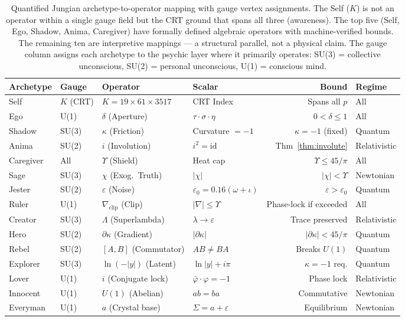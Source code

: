 \begin{table}[H]
\centering
{\small
\begin{tabular}{@{}llllrl@{}}
\toprule
\textbf{Archetype} & \textbf{Gauge} & \textbf{Operator} & \textbf{Scalar} & \textbf{Bound} & \textbf{Regime} \\
\midrule
Self       & $K$ (CRT)  & $K = 19\!\times\!61\!\times\!3517$ & CRT Index & Spans all $p$ & All \\
Ego        & U(1)       & $\delta$ (Aperture)   & $\tau \cdot \sigma \cdot \eta$ & $0 < \delta \leq 1$ & All \\
Shadow     & SU(3)      & $\kappa$ (Friction)   & Curvature $= -1$     & $\kappa = -1$ (fixed) & Quantum \\
Anima      & SU(2)      & $i$ (Involution)      & $i^2 = \mathrm{id}$  & Thm~\ref{thm:involute} & Relativistic \\
Caregiver  & All        & $\Upsilon$ (Shield)   & Heat cap  & $\Upsilon \leq 45/\pi$ & All \\
\midrule
Sage       & SU(3)      & $\chi$ (Exog.~Truth)  & $|\chi|$ & $|\chi| < \Upsilon$ & Newtonian \\
Jester     & SU(2)      & $\varepsilon$ (Noise) & $\varepsilon_0 = 0.16(\omega+\iota)$ & $\varepsilon > \varepsilon_0$ & Quantum \\
Ruler      & U(1)       & $\nabla_{\mathrm{clip}}$ (Clip) & $|\nabla| \leq \Upsilon$ & Phase-lock if exceeded & All \\
Creator    & SU(3)      & $\Lambda$ (Superlambda) & $\lambda \to \varepsilon$ & Trace preserved & Relativistic \\
\midrule
Hero       & SU(2)      & $\partial\kappa$ (Gradient) & $|\partial\kappa|$ & $|\partial\kappa| < 45/\pi$ & Quantum \\
Rebel      & SU(2)      & $[A, B]$ (Commutator) & $AB \neq BA$ & Breaks $U(1)$ & Quantum \\
Explorer   & SU(3)      & $\ln(-|y|)$ (Latent)  & $\ln|y| + i\pi$ & $\kappa = -1$ req. & Quantum \\
Lover      & U(1)       & $i$ (Conjugate lock)  & $\bar\varphi \cdot \varphi = -1$ & Phase lock & Relativistic \\
\midrule
Innocent   & U(1)       & $U(1)$ (Abelian)      & $ab = ba$ & Commutative & Newtonian \\
Everyman   & U(1)       & $a$ (Crystal base)    & $\Sigma = a + \varepsilon$ & Equilibrium & Newtonian \\
\bottomrule
\end{tabular}
}
\caption{Quantified Jungian archetype-to-operator mapping with gauge vertex assignments. The Self ($K$) is not an operator within a single gauge field but the CRT ground that spans all three (awareness). The top five (Self, Ego, Shadow, Anima, Caregiver) have formally defined algebraic operators with machine-verified bounds. The remaining ten are interpretive mappings --- a structural parallel, not a physical claim. The gauge column assigns each archetype to the psychic layer where it primarily operates: SU(3) = collective unconscious, SU(2) = personal unconscious, U(1) = conscious mind.}
\label{tab:jungian}
\end{table}

